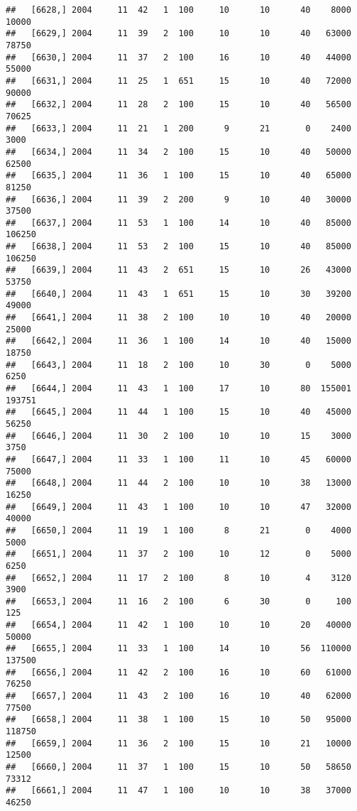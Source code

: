 \documentclass{article}\usepackage[]{graphicx}\usepackage[]{color}
\makeatletter
\newenvironment{kframe}{%
 \def\at@end@of@kframe{}%
 \ifinner\ifhmode%
  \def\at@end@of@kframe{\end{minipage}}%
  \begin{minipage}{\columnwidth}%
 \fi\fi%
 \def\FrameCommand##1{\hskip\@totalleftmargin \hskip-\fboxsep
 \colorbox{shadecolor}{##1}\hskip-\fboxsep
     \hskip-\linewidth \hskip-\@totalleftmargin \hskip\columnwidth}%
 \MakeFramed {\advance\hsize-\width
   \@totalleftmargin\z@ \linewidth\hsize
   \@setminipage}}%
 {\par\unskip\endMakeFramed%
 \at@end@of@kframe}
\newenvironment{knitrout}{}{} %
\makeatother
\begin{document}
\begin{knitrout}
\begin{kframe}
\begin{verbatim}
##   [6628,] 2004     11  42   1  100     10      10      40    8000   10000
##   [6629,] 2004     11  39   2  100     10      10      40   63000   78750
##   [6630,] 2004     11  37   2  100     16      10      40   44000   55000
##   [6631,] 2004     11  25   1  651     15      10      40   72000   90000
##   [6632,] 2004     11  28   2  100     15      10      40   56500   70625
##   [6633,] 2004     11  21   1  200      9      21       0    2400    3000
##   [6634,] 2004     11  34   2  100     15      10      40   50000   62500
##   [6635,] 2004     11  36   1  100     15      10      40   65000   81250
##   [6636,] 2004     11  39   2  200      9      10      40   30000   37500
##   [6637,] 2004     11  53   1  100     14      10      40   85000  106250
##   [6638,] 2004     11  53   2  100     15      10      40   85000  106250
##   [6639,] 2004     11  43   2  651     15      10      26   43000   53750
##   [6640,] 2004     11  43   1  651     15      10      30   39200   49000
##   [6641,] 2004     11  38   2  100     10      10      40   20000   25000
##   [6642,] 2004     11  36   1  100     14      10      40   15000   18750
##   [6643,] 2004     11  18   2  100     10      30       0    5000    6250
##   [6644,] 2004     11  43   1  100     17      10      80  155001  193751
##   [6645,] 2004     11  44   1  100     15      10      40   45000   56250
##   [6646,] 2004     11  30   2  100     10      10      15    3000    3750
##   [6647,] 2004     11  33   1  100     11      10      45   60000   75000
##   [6648,] 2004     11  44   2  100     10      10      38   13000   16250
##   [6649,] 2004     11  43   1  100     10      10      47   32000   40000
##   [6650,] 2004     11  19   1  100      8      21       0    4000    5000
##   [6651,] 2004     11  37   2  100     10      12       0    5000    6250
##   [6652,] 2004     11  17   2  100      8      10       4    3120    3900
##   [6653,] 2004     11  16   2  100      6      30       0     100     125
##   [6654,] 2004     11  42   1  100     10      10      20   40000   50000
##   [6655,] 2004     11  33   1  100     14      10      56  110000  137500
##   [6656,] 2004     11  42   2  100     16      10      60   61000   76250
##   [6657,] 2004     11  43   2  100     16      10      40   62000   77500
##   [6658,] 2004     11  38   1  100     15      10      50   95000  118750
##   [6659,] 2004     11  36   2  100     15      10      21   10000   12500
##   [6660,] 2004     11  37   1  100     15      10      50   58650   73312
##   [6661,] 2004     11  47   1  100     10      10      38   37000   46250

\end{verbatim}
\end{kframe}
\end{knitrout}
\end{document}
